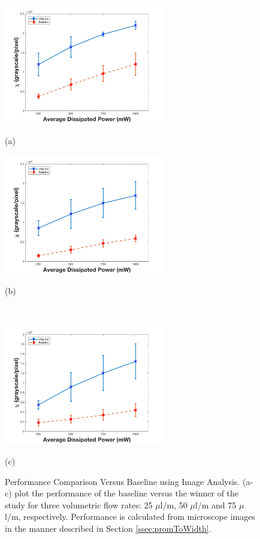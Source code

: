 \begin{figure}[H]
  \begin{minipage}[t]{0.49\linewidth}\centering
    \includegraphics[width=7cm]{ErrorBars25ul}
    \medskip
    \centerline{(a)}
  \end{minipage}\hfill
  \begin{minipage}[t]{0.49\linewidth}\centering
    \includegraphics[width=7cm]{ErrorBars50ul}
    \medskip
    \centerline{(b)}\\
  \end{minipage}
  \begin{minipage}[t]{0.99\linewidth}\centering
    \includegraphics[width=7cm]{ErrorBars75ul}
    \medskip
    \centerline{(c)}
  \end{minipage}
  \caption[Performance Comparison Versus Baseline using Image Analysis]{Performance Comparison Versus Baseline using Image Analysis. (a-c) plot the performance of the baseline versus the winner of the study for three volumetric flow rates: 25 $\mu$l/m, 50 $\mu$l/m and 75 $\mu$l/m, respectively. Performance is calculated from microscope images in the manner described in Section \ref{ssec:promToWidth}.}
	\label{fig:headToHeadImages}
\end{figure}

